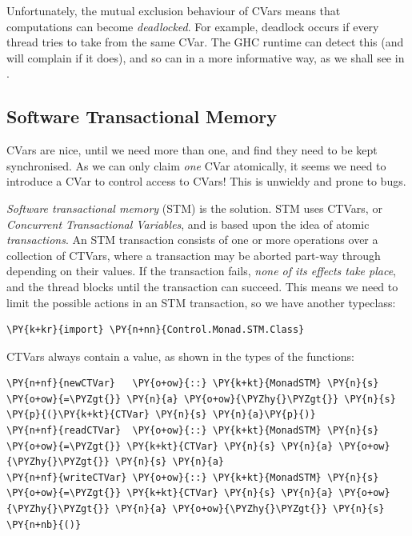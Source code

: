 Unfortunately, the mutual exclusion behaviour of CVars means that
computations can become \textit{deadlocked}. For example, deadlock
occurs if every thread tries to take from the same CVar. The GHC
runtime can detect this (and will complain if it does), and so can
\dejafu{} in a more informative way, as we shall see in
.

\subsection*{Software Transactional Memory}
\label{sec:dejafu-conc-stm}

CVars are nice, until we need more than one, and find they need to be
kept synchronised. As we can only claim \textit{one} CVar atomically,
it seems we need to introduce a CVar to control access to CVars! This
is unwieldy and prone to bugs.

\textit{Software transactional memory} (STM) is the solution. STM uses
CTVars, or \textit{Concurrent Transactional Variables}, and is based
upon the idea of atomic \textit{transactions}. An STM transaction
consists of one or more operations over a collection of CTVars, where
a transaction may be aborted part-way through depending on their
values. If the transaction fails, \textit{none of its effects take
  place}, and the thread blocks until the transaction can
succeed. This means we need to limit the possible actions in an STM
transaction, so we have another typeclass:


\begin{Verbatim}[commandchars=\\\{\}]
\PY{k+kr}{import} \PY{n+nn}{Control.Monad.STM.Class}
\end{Verbatim}

CTVars always contain a value, as shown in the types of the functions:


\begin{Verbatim}[commandchars=\\\{\}]
\PY{n+nf}{newCTVar}   \PY{o+ow}{::} \PY{k+kt}{MonadSTM} \PY{n}{s} \PY{o+ow}{=\PYZgt{}} \PY{n}{a} \PY{o+ow}{\PYZhy{}\PYZgt{}} \PY{n}{s} \PY{p}{(}\PY{k+kt}{CTVar} \PY{n}{s} \PY{n}{a}\PY{p}{)}
\PY{n+nf}{readCTVar}  \PY{o+ow}{::} \PY{k+kt}{MonadSTM} \PY{n}{s} \PY{o+ow}{=\PYZgt{}} \PY{k+kt}{CTVar} \PY{n}{s} \PY{n}{a} \PY{o+ow}{\PYZhy{}\PYZgt{}} \PY{n}{s} \PY{n}{a}
\PY{n+nf}{writeCTVar} \PY{o+ow}{::} \PY{k+kt}{MonadSTM} \PY{n}{s} \PY{o+ow}{=\PYZgt{}} \PY{k+kt}{CTVar} \PY{n}{s} \PY{n}{a} \PY{o+ow}{\PYZhy{}\PYZgt{}} \PY{n}{a} \PY{o+ow}{\PYZhy{}\PYZgt{}} \PY{n}{s} \PY{n+nb}{()}
\end{Verbatim}


